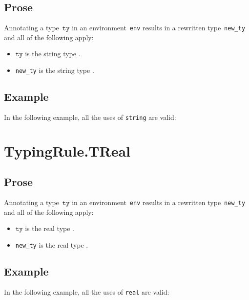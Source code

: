 \documentclass{book}
\newcommand\tty[0]{\texttt{ty}}
\begin{document}
\begin{itemize}
\subsection{Prose}
Annotating a type~$\tty$ in an environment~\texttt{env} results in a
rewritten type~\texttt{new\_ty} and all of the following apply:
\begin{itemize}
  \item $\tty$ is the string type \TString.
  \item \texttt{new\_ty} is the string type \TString.
\end{itemize}

\subsection{Example}
In the following example, all the uses of \texttt{string} are valid:





\section{TypingRule.TReal \label{sec:TypingRule.TReal}}

\subsection{Prose}
Annotating a type~$\tty$ in an environment~\texttt{env} results in a
rewritten type~\texttt{new\_ty} and all of the following apply:
\begin{itemize}
  \item $\tty$ is the real type \TReal.
  \item \texttt{new\_ty} is the real type \TReal.
\end{itemize}


\subsection{Example}
In the following example, all the uses of \texttt{real} are valid:




\end{itemize}
\end{document}
